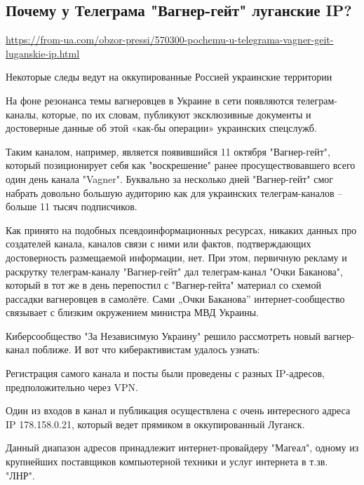  
 

\subsection{Почему у Телеграма "Вагнер-гейт" луганские IP?}

\url{https://from-ua.com/obzor-pressi/570300-pochemu-u-telegrama-vagner-geit-luganskie-ip.html}

Некоторые следы ведут на оккупированные Россией украинские территории

На фоне резонанса темы вагнеровцев в Украине в сети появляются телеграм-каналы,
которые, по их словам, публикуют эксклюзивные документы и достоверные данные об
этой «как-бы операции» украинских спецслужб.

Таким каналом, например, является появившийся 11 октября "Вагнер-гейт", который
позиционирует себя как "воскрешение" ранее просуществовавшего всего один день
канала "Vagner". Буквально за несколько дней "Вагнер-гейт" смог набрать
довольно большую аудиторию как для украинских телеграм-каналов – больше 11
тысяч подписчиков.

Как принято на подобных псевдоинформационных ресурсах, никаких данных про
создателей канала, каналов связи с ними или фактов, подтверждающих
достоверность размещаемой информации, нет. При этом, первичную рекламу и
раскрутку телеграм-каналу "Вагнер-гейт" дал телеграм-канал "Очки Баканова",
который в тот же в день перепостил с "Вагнер-гейта" материал со схемой рассадки
вагнеровцев в самолёте. Сами „Очки Баканова” интернет-сообщество связывает с
близким окружением министра МВД Украины.

Киберсообщество "За Независимую Украину" решило рассмотреть новый вагнер-канал
поближе. И вот что киберактивистам удалось узнать:

Регистрация самого канала и посты были проведены с разных IP-адресов,
предположительно через VPN.

Один из входов в канал и публикация осуществлена с очень интересного адреса IP
178.158.0.21, который ведет прямиком в оккупированный Луганск.

Данный диапазон адресов принадлежит интернет-провайдеру "Магеал", одному из
крупнейших поставщиков компьютерной техники и услуг интернета в т.зв. "ЛНР".

